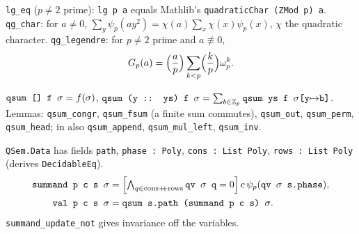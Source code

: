 \begin{theorem}
\textnormal{\texttt{lg\_\allowbreak{}eq}} ($p\ne2$ prime): \textnormal{\texttt{lg p a}} equals Mathlib's \textnormal{\texttt{quadraticChar (\allowbreak{}ZMod p) a}}.
\textnormal{\texttt{qg\_\allowbreak{}char}}: for $a\ne0$, $\sum_y\psi_p(ay^2) = \chi(a)\sum_x\chi(x)\psi_p(x)$, $\chi$ the
quadratic character. \textnormal{\texttt{qg\_\allowbreak{}legendre}}: for $p\ne2$ prime and $a\not\equiv0$,
\[
G_p(a) = \Bigl(\frac ap\Bigr)\sum_{k<p}\Bigl(\frac kp\Bigr)\omega_p^k .
\]
\end{theorem}

\begin{definition}
$\textnormal{\texttt{qsum [] f \ensuremath{\sigma}}} = f(\sigma)$, $\textnormal{\texttt{qsum (\allowbreak{}y :: ys) f \ensuremath{\sigma}}} = \sum_{b\in\mathbb{Z}_{p}}\textnormal{\texttt{qsum ys f \ensuremath{\sigma}[y\ensuremath{\mapsto}b]}}$.
Lemmas: \textnormal{\texttt{qsum\_\allowbreak{}congr}}, \textnormal{\texttt{qsum\_\allowbreak{}fsum}} (a finite sum commutes), \textnormal{\texttt{qsum\_\allowbreak{}out}},
\textnormal{\texttt{qsum\_\allowbreak{}perm}}, \textnormal{\texttt{qsum\_\allowbreak{}head}}; in  also \textnormal{\texttt{qsum\_\allowbreak{}append}},
\textnormal{\texttt{qsum\_\allowbreak{}mul\_\allowbreak{}left}}, \textnormal{\texttt{qsum\_\allowbreak{}inv}}.
\end{definition}

\begin{definition}\label{def:lean-pathsum-qdata}
\textnormal{\texttt{QSem.\allowbreak{}Data}} has fields \textnormal{\texttt{path}}, \textnormal{\texttt{phase : Poly}}, \textnormal{\texttt{cons : List Poly}},
\textnormal{\texttt{rows : List Poly}} (derives \textnormal{\texttt{DecidableEq}}).
\begin{align*}
\textnormal{\texttt{summand p c s \ensuremath{\sigma}}} &= \Bigl[\textstyle\bigwedge_{q\in\text{cons}\mathbin{+\!\!+}\text{rows}}\textnormal{\texttt{qv \ensuremath{\sigma} q}} = 0\Bigr]\,c\,\psi_p(\textnormal{\texttt{qv \ensuremath{\sigma} s.\allowbreak{}phase}}),\\
\textnormal{\texttt{val p c s \ensuremath{\sigma}}} &= \textnormal{\texttt{qsum s.\allowbreak{}path (\allowbreak{}summand p c s) \ensuremath{\sigma}}}.
\end{align*}
\textnormal{\texttt{summand\_\allowbreak{}update\_\allowbreak{}not}} gives invariance off the variables.
\end{definition}

